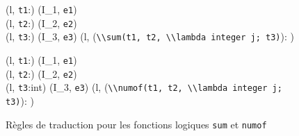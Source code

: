 \begin{figure*}[h!]
  \scriptsize{
    {
      {(l, \mbox{\lstinline't1'}:) 
        (I_1, \mbox{\lstinline'e1'}) \\
        (l, \mbox{\lstinline't2'}:) 
        (I_2, \mbox{\lstinline'e2'}) \\
        (l, \mbox{\lstinline't3'}:) 
        (I_3, \mbox{\lstinline'e3'})}
      {
        \splitfrac
            {(l,
              (\mbox{\lstinline'\\sum(t1, t2, \\lambda integer j; t3)'}):
              )
              }
            {
            }
      }{}
    }

    {
      {(l, \mbox{\lstinline't1'}:) 
        (I_1, \mbox{\lstinline'e1'}) \\
        (l, \mbox{\lstinline't2'}:) 
        (I_2, \mbox{\lstinline'e2'}) \\
        (l, \mbox{\lstinline't3'}:int)  (I_3, \mbox{\lstinline'e3'})}
      {
        \splitfrac
            {(l,
              (\mbox{\lstinline'\\numof(t1, t2, \\lambda integer j; t3)'}):
              )
              }
            {
            }
      }{}
    }
  }
  \caption{Règles de traduction pour les fonctions logiques \lstinline'sum' et
    \lstinline'numof'}
  \label{fig:builtin}
\end{figure*}
